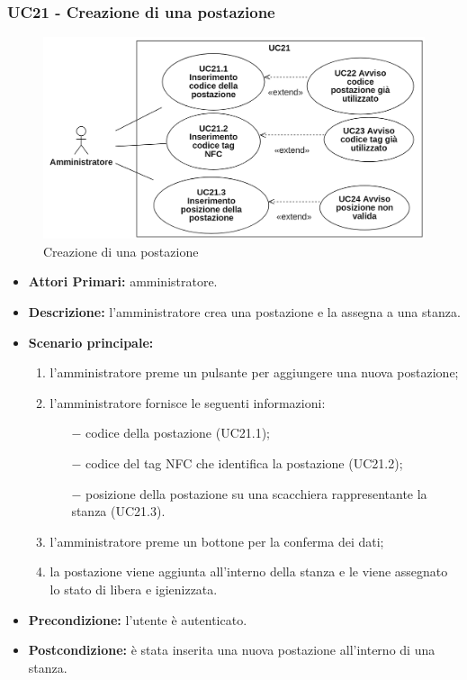 \subsubsection{UC21 - Creazione di una postazione}
\begin{figure}[H]
	\centering
	\includegraphics[width=15cm]{res/images/UC21.png}
	\caption{Creazione di una postazione}
\end{figure}
\begin{itemize}
	\item\textbf{Attori Primari:}
	amministratore.
	\item\textbf{Descrizione:}
	l'amministratore crea una postazione e la assegna a una stanza.
	\item\textbf{Scenario principale:} 
	\begin{enumerate}
		\item l'amministratore preme un pulsante per aggiungere una nuova postazione;
		\item l'amministratore fornisce le seguenti informazioni:
		\begin{itemize}
			\item[$-$] codice della postazione (UC21.1);
			\item[$-$] codice del tag NFC che identifica la postazione (UC21.2);
			\item[$-$] posizione della postazione su una scacchiera rappresentante la stanza (UC21.3).
		\end{itemize}
		\item l'amministratore preme un bottone per la conferma dei dati;
		\item la postazione viene aggiunta all'interno della stanza e le viene assegnato lo stato di libera e igienizzata.
	\end{enumerate}
	\item\textbf{Precondizione:} 
	l'utente è autenticato.
	\item\textbf{Postcondizione:}
	è stata inserita una nuova postazione all'interno di una stanza.
\end{itemize}

